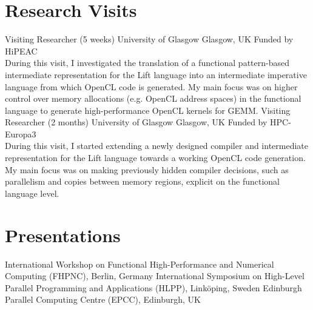\documentclass[11pt,a4paper]{moderncv}        %
\begin{document}
\newpage
\section{Research Visits}
			{Visiting Researcher (5 weeks)}
		    {University of Glasgow}
		    {Glasgow, UK}{}
			{Funded by HiPEAC\\
            During this visit, I investigated the translation of a functional pattern-based intermediate representation for the Lift language into an intermediate imperative language from which OpenCL code is generated.
            My main focus was on higher control over memory allocations (e.g. OpenCL address spaces) in the functional language to generate high-performance OpenCL kernels for GEMM.}
			{Visiting Researcher (2 months)}
		    {University of Glasgow}
		    {Glasgow, UK}{}
			{Funded by HPC-Europa3\\
             During this visit, I started extending a newly designed compiler and intermediate representation for the Lift language towards a working OpenCL code generation.
             My main focus was on making previously hidden compiler decisions, such as parallelism and copies between memory regions, explicit on the functional language level.}


\section{Presentations}
            {}{}{}{}
            {International Workshop on Functional High-Performance and Numerical Computing (FHPNC), Berlin, Germany}
            {}{}{}{}
            {International Symposium on High-Level Parallel Programming and Applications (HLPP), Linköping, Sweden}
            {}{}{}{}
            {Edinburgh Parallel Computing Centre (EPCC), Edinburgh, UK}
\end{document}
